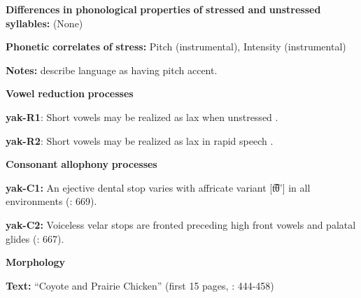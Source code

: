 \documentclass[output=paper]{langsci/langscibook}
\begin{document}
\begin{styleBody}
\textbf{Differences} \textbf{in} \textbf{phonological} \textbf{properties} \textbf{of} \textbf{stressed} \textbf{and} \textbf{unstressed} \textbf{syllables:} (None)
\end{styleBody}

\begin{styleBody}
\textbf{Phonetic} \textbf{correlates} \textbf{of} \textbf{stress:} Pitch (instrumental), Intensity (instrumental)
\end{styleBody}

\begin{styleBody}
\textbf{Notes:} \citet{HargusBeavert2005} describe language as having pitch accent.
\end{styleBody}

\begin{styleBody}
\textbf{Vowel} \textbf{reduction} \textbf{processes}
\end{styleBody}

\begin{styleBody}
\textbf{yak-R1}: Short vowels may be realized as lax when unstressed \citep[40]{Jansen2010}.
\end{styleBody}

\begin{styleBody}
\textbf{yak-R2}: Short vowels may be realized as lax in rapid speech \citep[40]{Jansen2010}.
\end{styleBody}

\begin{styleBody}
\textbf{Consonant} \textbf{allophony} \textbf{processes}
\end{styleBody}

\begin{styleBody}
\textbf{yak-C1:} An ejective dental stop varies with affricate variant [t͡θ’] in all environments (\citealt{RigsbyRude1996}: 669).
\end{styleBody}

\begin{styleBody}
\textbf{yak-C2:} Voiceless velar stops are fronted preceding high front vowels and palatal glides (\citealt{RigsbyRude1996}: 667).
\end{styleBody}

\begin{styleBody}
\textbf{Morphology}
\end{styleBody}

\begin{styleBody}
\textbf{Text:} “Coyote and Prairie Chicken” (first 15 pages, \citealt{Jansen2010}: 444-458)
\end{styleBody}
\end{document}
